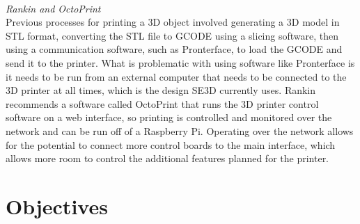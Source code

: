 \\
\textit{Rankin and OctoPrint}
\\
Previous processes for printing a 3D object involved generating a 3D model in STL format, converting the STL file to GCODE using a slicing software, then using a communication software, such as Pronterface, to load the GCODE and send it to the printer. What is problematic with using software like Pronterface is it needs to be run from an external computer that needs to be connected to the 3D printer at all times, which is the design SE3D currently uses. Rankin recommends a software called OctoPrint that runs the 3D printer control software on a web interface, so printing is controlled and monitored over the network and can be run off of a Raspberry Pi. Operating over the network allows for the potential to connect more control boards to the main interface, which allows more room to control the additional features planned for the printer.


\section{Objectives}

